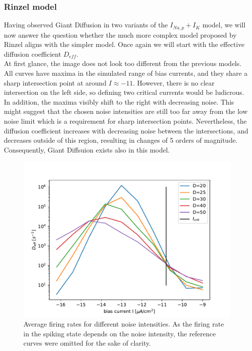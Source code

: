 \documentclass[12pt,a4paper]{article}
\begin{document}
\subsubsection{Rinzel model}\label{rinzelmodel}
Having observed Giant Diffusion in two variants of the $I_{Na,p}+I_K$ model, we will now answer the question whether the much more complex model proposed by Rinzel aligns with the simpler model. Once again we will start with the effective diffusion coefficient $D_{eff}$.\\
At first glance, the image does not look too different from the previous models. All curves have maxima in the simulated range of bias currents, and they share a sharp intersection point at around $I\approx-11$. However, there is no clear intersection on the left side, so defining two critical currents would be ludicrous. In addition, the maxima visibly shift to the right with decreasing noise. This might suggest that the chosen noise intensities are still too far away from the low noise limit which is a requirement for sharp intersection points. Nevertheless, the diffusion coefficient increases with decreasing noise between the intersections, and decreases outside of this region, resulting in changes of 5 orders of magnitude. Consequently, Giant Diffsuion exists also in this model.
\begin{figure}[H]
	\centering
	\includegraphics[scale=1]{dneursinglecritrealrinzelrangelong26d1realrinzelrange26d1.pdf}\caption{Average firing rates for different noise intensities. As the firing rate in the spiking state depends on the noise intensity, the reference curves were omitted for the sake of clarity.}
	\label{deffrinzel}
\end{figure}
\end{document}
